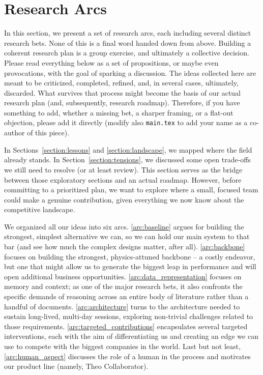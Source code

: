 \section{Research Arcs}
\label{section:research_arcs}

\renewcommand{\thesubsection}{Arc \arabic{subsection}}  %

\begin{highlightbox}
    In this section, we present a set of research arcs, each including several distinct research bets. None of this is a final word handed down from above. Building a coherent research plan is a group exercise, and ultimately a collective decision. Please read everything below as a set of propositions, or maybe even provocations, with the goal of sparking a discussion.
    The ideas collected here are meant to be criticized, completed, refined, and, in several cases, ultimately, discarded. What survives that process might become the basis of our actual research plan (and, subsequently, research roadmap). Therefore, if you have something to add, whether a missing bet, a sharper framing, or a flat-out objection, please add it directly (modify also \texttt{main.tex} to add your name as a co-author of this piece).
\end{highlightbox}

In Sections~\ref{section:lessons} and \ref{section:landscape}, we mapped where the field already stands. In Section~\ref {section:tensions}, we discussed some open trade-offs we still need to resolve (or at least review). This section serves as the bridge between those exploratory sections and an actual roadmap. However, before committing to a prioritized plan, we want to explore where a small, focused team could make a genuine contribution, given everything we now know about the competitive landscape. 

We organized all our ideas into six arcs. \ref{arc:baseline} argues for building the strongest, simplest alternative we can, so we can hold our main system to that bar (and see how much the complex designs matter, after all). \ref{arc:backbone} focuses on building the strongest, physics-attuned backbone -- a costly endeavor, but one that might allow us to generate the biggest leap in performance and will open additional business opportunities. \ref{arc:data_representation} focuses on memory and context; as one of the major research bets, it also confronts the specific demands of reasoning across an entire body of literature rather than a handful of documents. \ref{arc:architecture} turns to the architecture needed to sustain long-lived, multi-day sessions, exploring non-trivial challenges related to those requirements. \ref{arc:targeted_contributions} encapsulates several targeted interventions, each with the aim of differentiating us and creating an edge we can use to compete with the biggest companies in the world. Last but not least, \ref{arc:human_aspect} discusses the role of a human in the process and motivates our product line (namely, Theo Collaborator).

